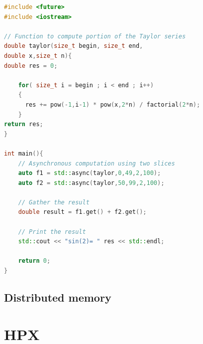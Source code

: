 \documentclass[11pt,fleqn]{book} %
\begin{document}
\begin{lstlisting}[language=c++,caption={Asynchronous computation of the $\sin$ function using a Taylor series.\label{code:async:taylor}},float,floatplacement=tb]
#include <future>
#include <iostream>

// Function to compute portion of the Taylor series
double taylor(size_t begin, size_t end, 
double x,size_t n){
double res = 0;

	for( size_t i = begin ; i < end ; i++)
	{
	  res += pow(-1,i-1) * pow(x,2*n) / factorial(2*n);
	} 
return res;
}

int main(){
	// Asynchronous computation using two slices
	auto f1 = std::async(taylor,0,49,2,100); 
	auto f2 = std::async(taylor,50,99,2,100); 
	
	// Gather the result
	double result = f1.get() + f2.get();

	// Print the result
	std::cout << "sin(2)= " res << std::endl;

	return 0;
}
\end{lstlisting}


\chapter{Distributed memory}


\newpage
\theendnotes


\part{HPX}
\label{sec:hpx}

\end{document}

